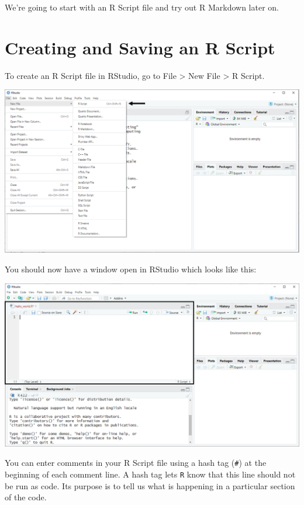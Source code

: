 \documentclass[
  letterpaper,
]{book}
\begin{document}
We're going to start with an R Script file and try out R Markdown later
on.

\hypertarget{creating-and-saving-an-r-script}{%
\section{Creating and Saving an R
Script}\label{creating-and-saving-an-r-script}}

To create an R Script file in RStudio, go to File \textgreater{} New
File \textgreater{} R Script.

\includegraphics{images/RStudio_Opening an R Script File.png}

You should now have a window open in RStudio which looks like this:

\includegraphics{images/RStudio_Opened RScript.png}

You can enter comments in your R Script file using a hash tag
(\texttt{\#}) at the beginning of each comment line. A hash tag lets
\texttt{R} know that this line should not be run as code. Its purpose is
to tell us what is happening in a particular section of the code.
\end{document}
